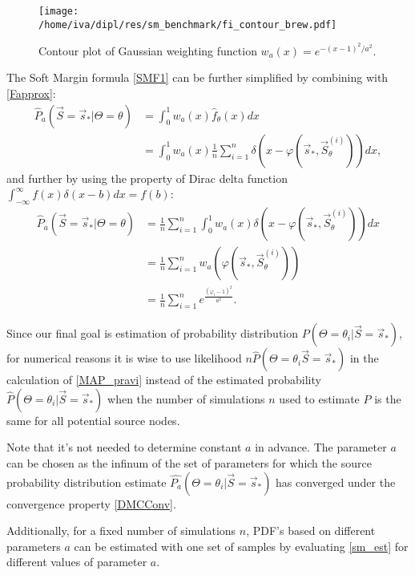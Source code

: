 \documentclass[times, utf8, diplomski]{fer}
\begin{document}
\begin{figure}[H]
\center
\texttt{[image: /home/iva/dipl/res/sm\_benchmark/fi\_contour\_brew.pdf]}
\caption{Contour plot of Gaussian weighting function $w_a(x) = e^{-(x -1)^2 / a ^2}$.}
\label{wax}
\end{figure}

The Soft Margin formula \ref{SMF1} can be further simplified by combining with \ref{Fapprox}:
\begin{equation}
\begin{aligned}
\hat{P}_a(\vec S = \vec s_* | \Theta = \theta) &= \int_0^1 w_a(x)\hat{f}_\theta(x)dx \\ &=
\int_0^1 w_a(x) \frac{1}{n} \sum_{i = 1}^{n}\delta(x - \varphi(\vec s_*, \vec S_{\theta}^{(i)})) dx,
\end{aligned}
\end{equation}
and further by using the property of Dirac delta function $\int_{-\infty}^{\infty} f(x)\delta(x - b)dx = f(b)$:
\begin{equation}
\begin{aligned}
\hat{P}_a(\vec S = \vec s_* | \Theta = \theta) &= \frac{1}{n} \sum_{i = 1}^{n} \int_0^1 w_a(x) \delta(x - \varphi(\vec s_*, \vec S_{\theta}^{(i)})) dx  \\ &= \frac{1}{n} \sum_{i = 1}^{n}  w_a(\varphi(\vec  s_*, \vec S_\theta^{(i)})) \\ &= \frac{1}{n} \sum_{i = 1}^{n} e ^{\frac{(\varphi_i -1)^2}{a ^2}}.
\end{aligned}
\label{sm_est}
\end{equation}


Since our final goal is estimation of probability distribution $P(\Theta = \theta_i | \vec S = \vec s_*) $, for numerical reasons it is wise to use likelihood $n\hat{P}(\Theta = \theta_i \vec S = \vec s_*)$ in the calculation of \ref{MAP_pravi} instead of the estimated probability $\hat{P}(\Theta = \theta_i | \vec S = \vec s_*)$ when the number of simulations $n$ used to estimate $\hat {P}$ is the same for all potential source nodes. 

Note that it's not needed to determine constant $a$ in advance. The parameter $a$ can be chosen as the infinum of the set of parameters for which the source probability distribution estimate $\hat{P_a}(\Theta = \theta_i | \vec S = \vec s_*)$ has converged under the convergence property \ref{DMCConv}. 

Additionally, for a fixed number of simulations $n$, PDF's  based on different parameters $a$ can be estimated with one set of samples by evaluating \ref{sm_est} for different values of parameter $a$. 
\end{document}
